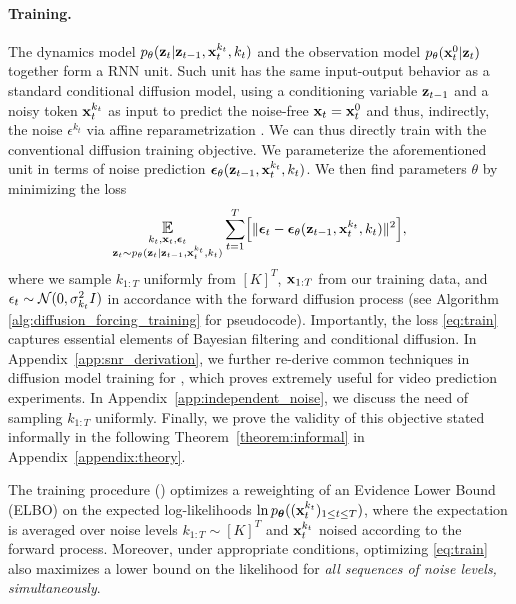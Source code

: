 \paragraph{Training.}
The dynamics model $p_{\theta}(\mathbf{z}_t |  \mathbf{z}_{t-1}, \mathbf{x}_t^{k_t}, k_t)$ and the observation model $p_{\theta}(\mathbf{x}_t^0 | \mathbf{z}_t)$ together form a RNN unit. Such unit has the same input-output behavior as a standard conditional diffusion model, using a conditioning variable $\mathbf{z}_{t-1}$ and a noisy token  $\mathbf{x}_t^{k_t}$ as input to predict the noise-free $\mathbf{x}_t = \mathbf{x}_t^0$ and thus, indirectly, the noise $\epsilon^{k_t}$ via affine reparametrization \cite{ddpm}. 
We can thus directly train \algopar{} with the conventional diffusion training objective. We parameterize the aforementioned  unit in terms of noise prediction $\bm{\epsilon}_{\theta}(\mathbf{z}_{t-1}, \mathbf{x}_t^{k_t}, k_t)$.
We then find parameters $\theta$ by minimizing the loss 
\begin{equation}\label{eq:train}
\mathop{\mathlarger{\mathbb{E}}}_{\substack{k_t, \bx_t, \beps_t \\ \bz_t\sim p_{\theta}(\bz_t|\bz_{t-1},\xtk,k_t)}} {\textstyle \mathlarger{\sum}_{t=1}^T}
\Big[\| \beps_t - \beps_\theta(\bz_{t-1},\xtk,k_t) \|^2\Big],
\end{equation}\vspace{-.1em}%
where we sample $k_{1:T}$ uniformly from $[K]^T$, $\mathbf{x}_{1:T}$ from our training data, and $\epsilon_t \sim \mathcal{N}(0,\sigma^2_{k_t} I)$ in accordance with the forward diffusion process (see Algorithm \ref{alg:diffusion_forcing_training}  for pseudocode). Importantly, the loss \eqref{eq:train} captures essential elements of Bayesian filtering and conditional diffusion. 
In Appendix~\ref{app:snr_derivation}, we further re-derive common techniques in diffusion model training for \algo{}, which proves extremely useful for video prediction experiments. In Appendix~\ref{app:independent_noise}, we discuss the need of sampling $k_{1:T}$ uniformly. Finally, we prove the validity of this objective stated informally in the following Theorem~\ref{theorem:informal} in Appendix~\ref{appendix:theory}.
\vspace{2pt}
\begin{theorem}[Informal] The \algo{} training procedure () optimizes a reweighting of an Evidence Lower Bound (ELBO) on the expected log-likelihoods $\ln p_{\bm \theta}((\mathbf{x}_t^{k_t})_{1 \le t \le T})$, where the expectation is averaged over noise levels $k_{1:T} \sim [K]^T$ and $\mathbf{x}_t^{k_t} $ noised according to the forward process. Moreover, under appropriate conditions, optimizing \eqref{eq:train} also maximizes a lower bound on the likelihood for \emph{all sequences of noise levels, simultaneously}. 
\label{theorem:informal}
\end{theorem}

